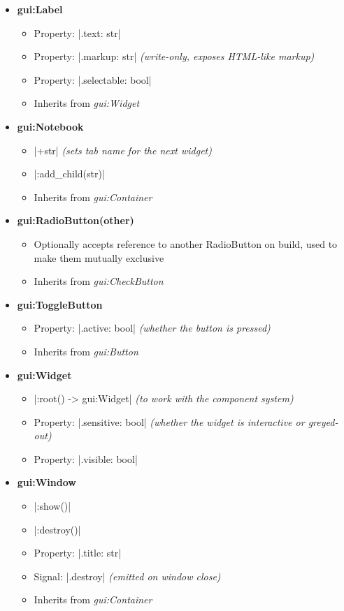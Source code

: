 \documentclass[11pt]{report}
\begin{document}
\begin{multicols}{2}
\begin{itemize}[topsep=0pt,leftmargin=*]
    \item \textbf{gui:Label}
    \begin{itemize}[nosep,topsep=0pt,leftmargin=*]
    \item Property: |.text: str|
    \item Property: |.markup: str| \emph{(write-only, exposes HTML-like markup)}
    \item Property: |.selectable: bool|
    \item Inherits from \emph{gui:Widget}
    \end{itemize}
    \item \textbf{gui:Notebook}
    \begin{itemize}[nosep,topsep=0pt,leftmargin=*]
    \item |+str| \emph{(sets tab name for the next widget)}
    \item |:add_child(str)|
    \item Inherits from \emph{gui:Container}
    \end{itemize}
    \item \textbf{gui:RadioButton(other)}
    \begin{itemize}[nosep,topsep=0pt,leftmargin=*]
    \item Optionally accepts reference to another RadioButton on build, used to make them mutually exclusive
    \item Inherits from \emph{gui:CheckButton}
    \end{itemize}
    \item \textbf{gui:ToggleButton}
    \begin{itemize}[nosep,topsep=0pt,leftmargin=*]
    \item Property: |.active: bool| \emph{(whether the button is pressed)}
    \item Inherits from \emph{gui:Button}
    \end{itemize}
    \item \textbf{gui:Widget}
    \begin{itemize}[nosep,topsep=0pt,leftmargin=*]
    \item |:root() -> gui:Widget| \emph{(to work with the component system)}
    \item Property: |.sensitive: bool| \emph{(whether the widget is interactive or greyed-out)}
    \item Property: |.visible: bool|
    \end{itemize}
    \item \textbf{gui:Window}
    \begin{itemize}[nosep,topsep=0pt,leftmargin=*]
    \item |:show()|
    \item |:destroy()|
    \item Property: |.title: str|
    \item Signal: |.destroy| \emph{(emitted on window close)}
    \item Inherits from \emph{gui:Container}
    \end{itemize}
\end{itemize}
\end{multicols}
\end{document}
